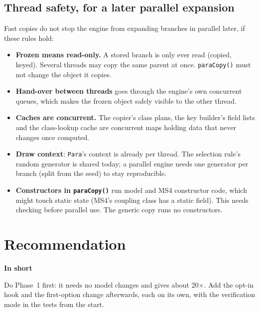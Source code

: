 \documentclass[11pt]{article}
\newcommand{\code}[1]{\texttt{#1}}
\newcommand{\shadedbox}[3]{\par\smallskip\noindent\colorbox{#1}{\parbox{\dimexpr\linewidth-2\fboxsep}{\textbf{#2}\par #3}}\par\smallskip}
\newcommand{\takeaway}[1]{\shadedbox{okbg}{In short}{#1}}
\begin{document}
\subsection{Thread safety, for a later parallel expansion}
Fast copies do not stop the engine from expanding branches in parallel later, if these rules hold:
\begin{itemize}
\item \textbf{Frozen means read-only.} A stored branch is only ever read (copied, keyed). Several threads may copy the
  same parent at once. \code{paraCopy()} must not change the object it copies.
\item \textbf{Hand-over between threads} goes through the engine's own concurrent queues, which makes the frozen
  object safely visible to the other thread.
\item \textbf{Caches are concurrent.} The copier's class plans, the key builder's field lists and the class-lookup
  cache are concurrent maps holding data that never changes once computed.
\item \textbf{Draw context}: \code{Para}'s context is already per thread. The selection rule's random generator is
  shared today; a parallel engine needs one generator per branch (split from the seed) to stay reproducible.
\item \textbf{Constructors in \code{paraCopy()}} run model and MS4 constructor code, which might touch static state
  (MS4's coupling class has a static field). This needs checking before parallel use. The generic copy runs no
  constructors.
\end{itemize}

\section{Recommendation}\label{sec:recommend}

\takeaway{Do Phase~1 first: it needs no model changes and gives about 20$\times$. Add the opt-in hook and the
first-option change afterwards, each on its own, with the verification mode in the tests from the start.}
\end{document}
